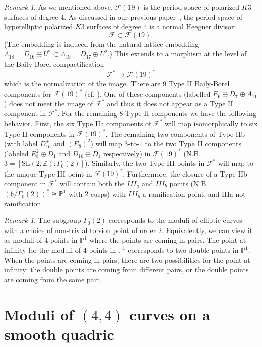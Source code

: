 \documentclass[11pt]{amsart}
\numberwithin{equation}{section}
\theoremstyle{plain}
\theoremstyle{remark}
\newtheorem{remark}[theorem]{Remark}
\theoremstyle{definition}
\newcommand{\bP}{\mathbb{P}}
\newcommand{\bZ}{\mathbb{Z}}
\newcommand{\sF}{\mathscr{F}}
\newcommand{\calF}{\mathcal{F}}
\newcommand{\SL}{\mathrm{SL}}
\begin{document}
\begin{remark}\label{rmk:remnormalize}
%
As we mentioned above, $\calF(19)$ is the period space of polarized $K3$ surfaces of degree $4$. As discussed in our previous paper~\cite{log1}, the period space of  hyperelliptic polarized $K3$ surfaces of degree $4$ is  a normal Heegner divisor:
%
$$\calF\subset \calF(19).$$
%
(The embedding is induced from the natural lattice embedding $\Lambda_{18}=D_{16}\oplus U^2\subset \Lambda_{19}=D_{17} \oplus U^2$.) This extends to a morphism at the level of the Baily-Borel compactification 
%
$$\calF^*\to \calF(19)^*$$
%
which is the normalization of the image. There are $9$ Type II Baily-Borel components for $\calF(19)^*$ (cf. \cite[\S6.3]{scattone}). One of these components (labelled $E_6\oplus D_7\oplus A_{11}$) does not meet the image of $\calF^*$ and thus it does not appear as a Type II component in $\sF^*$. For the remaining $8$ Type II components we have the following behavior. First, the six Type IIa components of $\calF^*$ will map isomorphically to six Type II components in $\calF(19)^*$. The remaining two components of Type IIb (with label $D_{16}^+$ and $(E_8)^2$) will map $3$-to-$1$ to the two Type II components (labeled $E_8^2\oplus D_1$ and $D_{16}\oplus D_1$ respectively) in $\calF(19)^*$ (N.B. $3=[\SL(2,\bZ):\Gamma_0(2)]$).  Similarly, the two Type III points in $\calF^*$ will map to the unique Type III point in $\calF(19)^*$. Furthermore,  the  closure of a Type IIb component in $\sF^*$ will contain both the $III_a$ and  $III_b$ points (N.B. $(\mathfrak h/\Gamma_0(2))^*\cong \bP^1$ with $2$ cusps) with $III_b$ a ramification point, and IIIa not ramification. 
\end{remark}

\begin{remark}
The subgroup $\Gamma_0(2)$ corresponds to the moduli of elliptic curves with a choice of non-trivial torsion point of order $2$. Equivalently, we can view it as moduli of $4$ points in $\bP^1$ where the points are coming in pairs. The point at infinity for the moduli of $4$ points in $\bP^1$ corresponds to two double points in $\bP^1$. When the points are coming in pairs, there are two possibilities for the point at infinity: the double points are coming from different pairs, or the double points are coming from the same pair. 
\end{remark}


\section{Moduli of $(4,4)$ curves on a smooth quadric}\label{sec:quattro}
%
\end{document}
